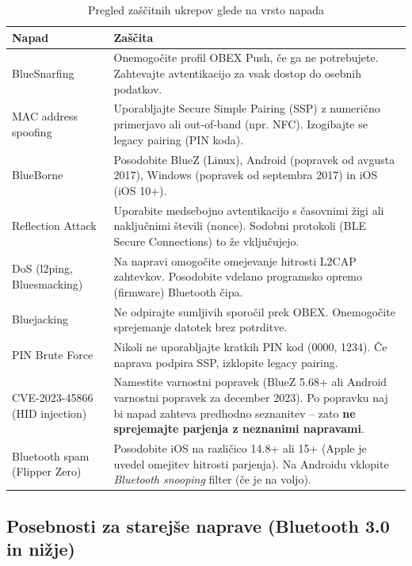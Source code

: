 \documentclass[11pt,a4paper,slovene]{article}
\begin{document}
\begin{table}[H]
	\centering
	\small
	\renewcommand{\arraystretch}{1.2}
	\begin{tabularx}{\linewidth}{|l|X|}
		\hline
		\textbf{Napad} & \textbf{Zaščita} \\
		\hline
		BlueSnarfing & Onemogočite profil OBEX Push, če ga ne potrebujete. Zahtevajte avtentikacijo za vsak dostop do osebnih podatkov. \\
		\hline
		MAC address spoofing & Uporabljajte Secure Simple Pairing (SSP) z numerično primerjavo ali out‑of‑band (npr. NFC). Izogibajte se legacy pairing (PIN koda). \\
		\hline
		BlueBorne & Posodobite BlueZ (Linux), Android (popravek od avgusta 2017), Windows (popravek od septembra 2017) in iOS (iOS 10+). \\
		\hline
		Reflection Attack & Uporabite medsebojno avtentikacijo s časovnimi žigi ali naključnimi števili (nonce). Sodobni protokoli (BLE Secure Connections) to že vključujejo. \\
		\hline
		DoS (l2ping, Bluesmacking) & Na napravi omogočite omejevanje hitrosti L2CAP zahtevkov. Posodobite vdelano programsko opremo (firmware) Bluetooth čipa. \\
		\hline
		Bluejacking & Ne odpirajte sumljivih sporočil prek OBEX. Onemogočite sprejemanje datotek brez potrditve. \\
		\hline
		PIN Brute Force & Nikoli ne uporabljajte kratkih PIN kod (0000, 1234). Če naprava podpira SSP, izklopite legacy pairing. \\
		\hline
		CVE-2023-45866 (HID injection) & Namestite varnostni popravek (BlueZ 5.68+ ali Android varnostni popravek za december 2023). Po popravku naj bi napad zahteva predhodno seznanitev – zato \textbf{ne sprejemajte parjenja z neznanimi napravami}. \\
		\hline
		Bluetooth spam (Flipper Zero) & Posodobite iOS na različico 14.8+ ali 15+ (Apple je uvedel omejitev hitrosti parjenja). Na Androidu vklopite \textit{Bluetooth snooping} filter (če je na voljo). \\
		\hline
	\end{tabularx}
	\caption{Pregled zaščitnih ukrepov glede na vrsto napada}
	\label{tab:bluetooth_defense}
\end{table}

\subsection{Posebnosti za starejše naprave (Bluetooth 3.0 in nižje)}
\end{document}
